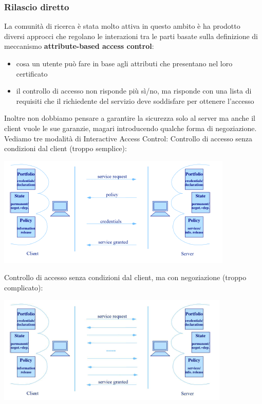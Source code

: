 \subsubsection{Rilascio diretto}
La comunità di ricerca è stata molto attiva in questo ambito è ha prodotto diversi approcci che regolano le interazioni tra le parti basate sulla definizione di meccanismo \textbf{attribute-based access control}:
\begin{itemize}
    \item cosa un utente può fare in base agli attributi che presentano nel loro certificato
    \item il controllo di accesso non risponde più sì/no, ma risponde con una lista di requisiti che il richiedente del servizio deve soddisfare per ottenere l'accesso
\end{itemize}
Inoltre non dobbiamo pensare a garantire la sicurezza solo al server ma anche il client vuole le sue garanzie, magari introducendo qualche forma di negoziazione.\\
Vediamo tre modalità di Interactive Access Control:
Controllo di accesso senza condizioni dal client (troppo semplice):
\begin{center}
    \includegraphics[scale=0.6]{img/iac1.png}
\end{center}
Controllo di accesso senza condizioni dal client, ma con negoziazione (troppo complicato):
\begin{center}
    \includegraphics[scale=0.6]{img/iac2.png}
\end{center}
